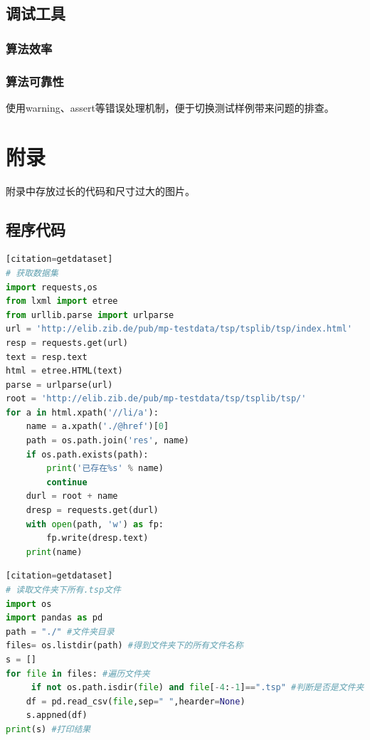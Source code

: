 \documentclass[lang=cn,11pt]{elegantpaper}
\begin{document}
\subsection{调试工具}
\subsubsection{算法效率}


\subsubsection{算法可靠性}
使用warning、assert等错误处理机制，便于切换测试样例带来问题的排查。










\clearpage 



\clearpage 
\appendix
\section{附录}
附录中存放过长的代码和尺寸过大的图片。
\subsection{程序代码}
\begin{lstlisting}[language=python][citation=getdataset]
# 获取数据集
import requests,os
from lxml import etree
from urllib.parse import urlparse
url = 'http://elib.zib.de/pub/mp-testdata/tsp/tsplib/tsp/index.html'
resp = requests.get(url)
text = resp.text
html = etree.HTML(text)
parse = urlparse(url)
root = 'http://elib.zib.de/pub/mp-testdata/tsp/tsplib/tsp/'
for a in html.xpath('//li/a'):
    name = a.xpath('./@href')[0]
    path = os.path.join('res', name)
    if os.path.exists(path):
        print('已存在%s' % name)
        continue
    durl = root + name
    dresp = requests.get(durl)
    with open(path, 'w') as fp:
        fp.write(dresp.text)
    print(name)
\end{lstlisting}

\begin{lstlisting}[language=python][citation=getdataset]
# 读取文件夹下所有.tsp文件
import os
import pandas as pd
path = "./" #文件夹目录
files= os.listdir(path) #得到文件夹下的所有文件名称
s = []
for file in files: #遍历文件夹
     if not os.path.isdir(file) and file[-4:-1]==".tsp" #判断是否是文件夹，不是文件夹才打开
    df = pd.read_csv(file,sep=" ",hearder=None)
    s.appned(df)
print(s) #打印结果
\end{lstlisting}
\end{document}

